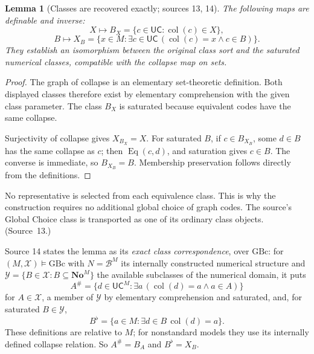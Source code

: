 \documentclass[11pt,letterpaper]{article}
\newtheorem{lemma}[lemma]{Lemma}\aliascntresetthe{lemma}
\theoremstyle{definition}
\theoremstyle{remark}
\newcommand{\No}{\mathbf{No}}
\newcommand{\B}{\mathcal B}
\newcommand{\GBc}{\mathrm{GBc}}
\newcommand{\Eqc}{\operatorname{Eq}}
\newcommand{\UC}{\mathsf{UC}}
\begin{document}
\begin{lemma}[Classes are recovered exactly; sources 13, 14]\label{hset:sf:lem:classinverse}
The following maps are definable and inverse:
\[
 X\longmapsto B_X=\{c\in \UC:\operatorname{col}(c)\in X\},
\]
\[
 B\longmapsto X_B=\{x\in M:\exists c\in \UC\,(\operatorname{col}(c)=x\land c\in B)\}.
\]
They establish an isomorphism between the original class sort and the saturated
numerical classes, compatible with the collapse map on sets.
\end{lemma}
\begin{proof}
The graph of collapse is an elementary set-theoretic definition. Both displayed
classes therefore exist by elementary comprehension with the given class parameter.
The class $B_X$ is saturated because equivalent codes have the same collapse.

Surjectivity of collapse gives $X_{B_X}=X$. For saturated $B$, if $c\in B_{X_B}$,
some $d\in B$ has the same collapse as $c$; then $\Eqc(c,d)$, and saturation gives
$c\in B$. The converse is immediate, so $B_{X_B}=B$. Membership preservation follows
directly from the definitions.
\end{proof}

No representative is selected from each equivalence class. This is why the
construction requires no additional global choice of graph codes. The source's
Global Choice class is transported as one of its ordinary class objects.
(Source~13.)

Source 14 states the lemma as its \emph{exact class correspondence}, over $\GBc$:
for $(M,\mathcal X)\models\GBc$ with $N=\B^M$ its internally constructed numerical
structure and $\mathcal Y=\{B\in\mathcal X:B\subseteq\No^M\}$ the available
subclasses of the numerical domain, it puts
\begin{equation}\label{hset:sf:eq:sharp}
 A^\#=\{d\in \UC^M:\exists a\,(\operatorname{col}(d)=a\land a\in A)\}
\end{equation}
for $A\in\mathcal X$, a member of $\mathcal Y$ by elementary comprehension and
saturated, and, for saturated $B\in\mathcal Y$,
\begin{equation}\label{hset:sf:eq:flat}
 B^\flat=\{a\in M:\exists d\in B\,\operatorname{col}(d)=a\}.
\end{equation}
These definitions are relative to $M$; for nonstandard models they use its
internally defined collapse relation. So $A^\#=B_A$ and $B^\flat=X_B$.
\end{document}
